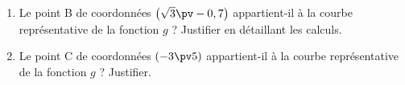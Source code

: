 \documentclass[12pt,french,oneside]{report}
\begin{document}
\begin{spacing}{1.2}
\begin{Exercice}[(9,5 points)]
\begin{enumerate}
\item Le point B de coordonnées $\left(\sqrt{3}\pv -0,7\right)$ appartient-il à la courbe représentative de la fonction $g$ ? Justifier en détaillant les calculs.

\item Le point C de coordonnées $(-3\pv 5)$ appartient-il à la courbe représentative de la fonction $g$ ? Justifier.
\end{enumerate}

\end{Exercice}


\end{spacing}

\end{document}
